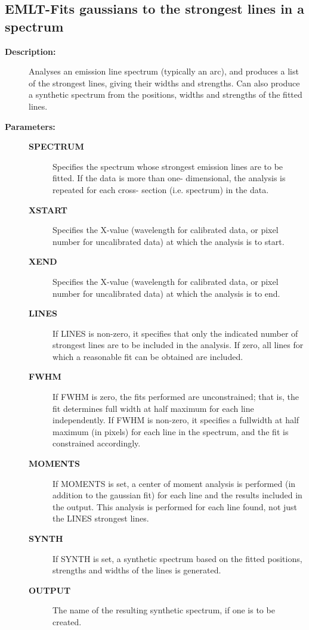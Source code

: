 \subsection{EMLT-\label{EMLT}Fits gaussians to the strongest lines in a spectrum}
\begin{description}

\item [{\bf Description:}]
 Analyses an emission line spectrum (typically an arc), and
 produces a list of the strongest lines, giving their widths
 and strengths.  Can also produce a synthetic spectrum from
 the positions, widths and strengths of the fitted lines.

\item [{\bf Parameters:}]
\begin{description}
\item [{\bf SPECTRUM}]
 Specifies the spectrum whose strongest emission
 lines are to be fitted.  If the data is more than one-
 dimensional, the analysis is repeated for each cross-
 section (i.e. spectrum) in the data.
\item [{\bf XSTART}]
 Specifies the X-value (wavelength for calibrated
 data, or pixel number for uncalibrated data) at which
 the analysis is to start.
\item [{\bf XEND}]
 Specifies the X-value (wavelength for calibrated
 data, or pixel number for uncalibrated data) at which
 the analysis is to end.
\item [{\bf LINES}]
 If LINES is non-zero, it specifies that only the
 indicated number of strongest lines are to be included
 in the analysis.  If zero, all lines for which a
 reasonable fit can be obtained are included.
\item [{\bf FWHM}]
 If FWHM is zero, the fits performed are unconstrained;
 that is, the fit determines full width at half maximum
 for each line independently.  If FWHM is non-zero, it
 specifies a fullwidth at half maximum (in pixels) for
 each line in the spectrum, and the fit is constrained
 accordingly.
\item [{\bf MOMENTS}]
 If MOMENTS is set, a center of moment analysis is
 performed (in addition to the gaussian fit) for
 each line and the results included in the output.
 This analysis is performed for each line found, not
 just the LINES strongest lines.
\item [{\bf SYNTH}]
 If SYNTH is set, a synthetic spectrum based on the
 fitted positions, strengths and widths of the lines
 is generated.
\item [{\bf OUTPUT}]
 The name of the resulting synthetic spectrum, if one
 is to be created.
\end{description}


\end{description}

